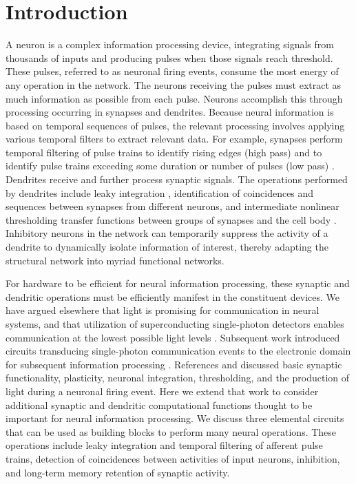 \documentclass[twocolumn]{article}
\begin{document}
\section{\label{sec:introduction}Introduction}
A neuron is a complex information processing device, integrating signals from thousands of inputs and producing pulses when those signals reach threshold. These pulses, referred to as neuronal firing events, consume the most energy of any operation in the network. The neurons receiving the pulses must extract as much information as possible from each pulse. Neurons accomplish this through processing occurring in synapses and dendrites. Because neural information is based on temporal sequences of pulses, the relevant processing involves applying various temporal filters to extract relevant data. For example, synapses perform temporal filtering of pulse trains to identify rising edges (high pass) and to identify pulse trains exceeding some duration or number of pulses (low pass) \cite{}. Dendrites receive and further process synaptic signals. The operations performed by dendrites include leaky integration \cite{}, identification of coincidences \cite{} and sequences \cite{haah2015} between synapses from different neurons, and intermediate nonlinear thresholding transfer functions between groups of synapses and the cell body \cite{}. Inhibitory neurons in the network can temporarily suppress the activity of a dendrite to dynamically isolate information of interest, thereby adapting the structural network into myriad functional networks.

For hardware to be efficient for neural information processing, these synaptic and dendritic operations must be efficiently manifest in the constituent devices. We have argued elsewhere that light is promising for communication in neural systems, and that utilization of superconducting single-photon detectors enables communication at the lowest possible light levels \cite{shbu2017}. Subsequent work introduced circuits transducing single-photon communication events to the electronic domain for subsequent information processing \cite{sh2018,sh2018_full}. References \cite{sh2018} and \cite{sh2018_full} discussed basic synaptic functionality, plasticity, neuronal integration, thresholding, and the production of light during a neuronal firing event. Here we extend that work to consider additional synaptic and dendritic computational functions thought to be important for neural information processing. We discuss three elemental circuits that can be used as building blocks to perform many neural operations. These operations include leaky integration and temporal filtering of afferent pulse trains, detection of coincidences between activities of input neurons, inhibition, and long-term memory retention of synaptic activity.
\end{document}
